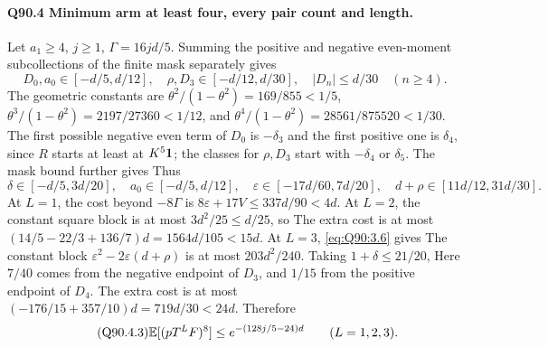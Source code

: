 \paragraph{Q90.4 Minimum arm at least four, every pair count and length.}
Let \(a_1\ge\allowbreak 4\), \(j\ge\allowbreak 1\), \(\Gamma=\allowbreak 16jd/5\).
Summing the positive and negative even-moment subcollections of the
finite mask separately gives
\begin{equation}\tag{Q90.4.1}\label{eq:Q90:4.1}
D_0,a_0\in[-d/5,d/12],\quad
\rho,D_3\in[-d/12,d/30],\quad |D_n|\le d/30\quad(n\ge4).
\end{equation}
The geometric constants are \(\theta^2/(1-\theta^2)=\allowbreak 169/855<\allowbreak 1/5\),
\(\theta^3/(1-\theta^2)=\allowbreak 2197/27360<\allowbreak 1/12\), and
\(\theta^4/(1-\theta^2)=\allowbreak 28561/875520<\allowbreak 1/30\).
The first possible negative even term of \(D_0\) is \(-\delta_3\)
and the first positive one is \(\delta_4\), since \(R\) starts at
least at \(K^5\mathbf1\); the classes for \(\rho,\allowbreak D_3\) start with
\(-\delta_4\) or \(\delta_5\).
The mask bound further gives
Thus
\begin{equation}\tag{Q90.4.2}\label{eq:Q90:4.2}
\delta\in[-d/5,3d/20],\quad a_0\in[-d/5,d/12],\quad
\varepsilon\in[-17d/60,7d/20],\quad
d+\rho\in[11d/12,31d/30].
\end{equation}
At \(L=\allowbreak 1\), the cost beyond \(-8\Gamma\) is
\(8\varepsilon+17V\le\allowbreak 337d/90<\allowbreak 4d\).
At \(L=\allowbreak 2\), the constant square block is at most
\(3d^2/25\le\allowbreak  d/25\), so
The extra cost is at most
\((14/5-22/3+136/7)d=\allowbreak 1564d/105<\allowbreak 15d\).
At \(L=\allowbreak 3\), \eqref{eq:Q90:3.6} gives
The constant block \(\varepsilon^2-2\varepsilon(d+\rho)\)
is at most \(203d^2/240\). Taking \(1+\delta\le\allowbreak 21/20\),
Here \(7/40\) comes from the negative endpoint of \(D_3\), and
\(1/15\) from the positive endpoint of \(D_4\).
The extra cost is at most
\((-176/15+357/10)d=\allowbreak 719d/30<\allowbreak 24d\). Therefore
\begin{equation}\tag{Q90.4.3}\label{eq:Q90:4.3}
\mathbb E[(pT^LF)^8]\le e^{-(128j/5-24)d}\qquad(L=1,2,3).
\end{equation}
